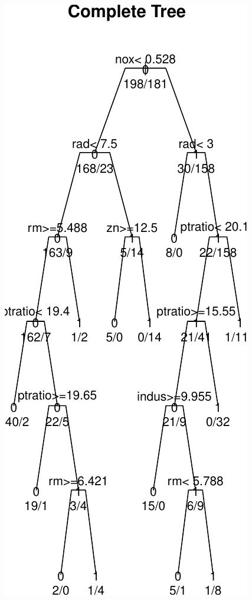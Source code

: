 \documentclass[]{article}
\begin{document}
\begin{center}\includegraphics{HW4_Solution_files/figure-latex/unnamed-chunk-13-1} \end{center}
\end{document}
